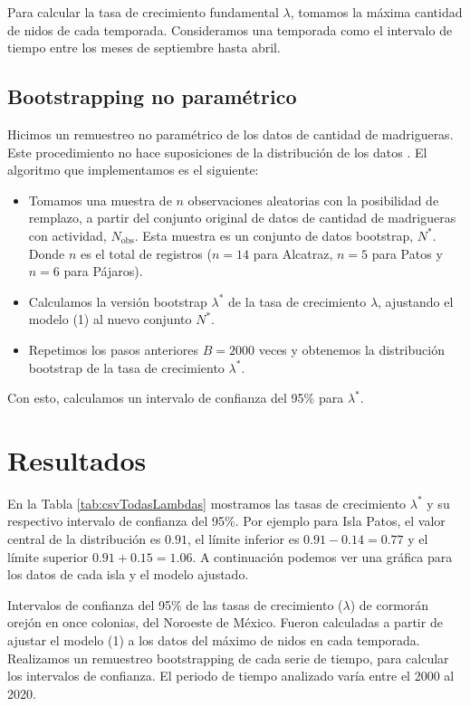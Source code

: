 \documentclass{article} %
\begin{document}
Para calcular la tasa de crecimiento fundamental $\lambda$, tomamos la máxima cantidad de nidos de cada temporada. Consideramos una temporada como el intervalo de tiempo entre los meses de septiembre hasta abril.

\subsection*{Bootstrapping no paramétrico}

Hicimos un remuestreo no paramétrico de los datos de cantidad de madrigueras. Este procedimiento no hace suposiciones de la distribución de los datos \cite{carpenter2000bootstrap}. El algoritmo que implementamos es el siguiente: 

\begin{itemize}
    \item Tomamos una muestra de $n$ observaciones aleatorias con la posibilidad de remplazo, a partir del conjunto original de datos de cantidad de madrigueras con actividad, $ N_{\mbox{obs}} $. Esta muestra es un conjunto de datos bootstrap, $N^{*}$. Donde $n$ es el total de registros ($n=14$ para Alcatraz, $n=5$ para Patos y $n=6$ para Pájaros).
    \item Calculamos la versión bootstrap $\lambda^*$ de la tasa de crecimiento $\lambda$, ajustando el modelo (1) al nuevo conjunto $N^{*}$.
    \item Repetimos los pasos anteriores $B = 2000$ veces y obtenemos la distribución bootstrap de la tasa de crecimiento $\lambda^*$.
\end{itemize}

Con esto, calculamos un intervalo de confianza del 95\% para $ \lambda^* $. 

\section*{Resultados}

En la Tabla \ref{tab:csvTodasLambdas}  mostramos las tasas de crecimiento $\lambda^*$ y su respectivo intervalo de confianza del 95\%. Por ejemplo para Isla Patos, el valor central de la distribución es $0.91$, el límite inferior es $0.91 - 0.14 = 0.77$ y el límite superior $ 0.91 + 0.15 = 1.06$. A continuación podemos ver una gráfica para los datos de cada isla y el modelo ajustado.

\begin{table}[H]
  \centering
  \caption{Intervalos de confianza del 95\% de las tasas de crecimiento ($\lambda$) de cormorán orejón en once colonias, del Noroeste de México. Fueron calculadas a partir de ajustar el modelo (1) a los datos del máximo de nidos en cada temporada. Realizamos un remuestreo bootstrapping de cada serie de tiempo, para calcular los intervalos de confianza. El periodo de tiempo analizado varía entre el 2000 al 2020.}
   \pgfplotstabletypeset[
     string type,
     columns={Islet,{Growth rate}},
     assign column name/.style={/pgfplots/table/column name={\textbf{#1}}},
    every head row/.style={before row=\toprule,after row=\midrule},
    every last row/.style={after row=\bottomrule},
    ]{\AllGrowthRates}
  \label{tab:csvTodasLambdas}
\end{table}
\end{document}
